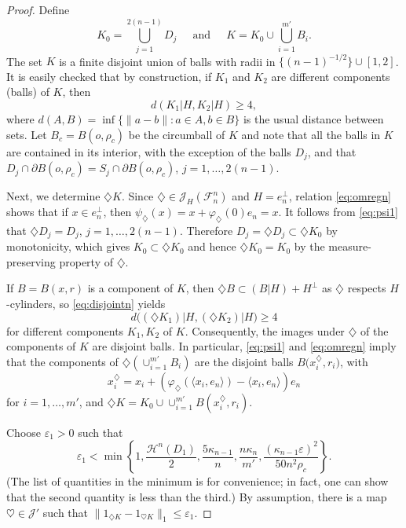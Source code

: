 \documentclass[10pt,a4paper]{amsart}
\newcommand{\cF}{\mathcal F}
\newcommand{\cH}{{\mathcal H}}
\newcommand{\cJ}{\mathcal J}
\newcommand{\di}{\diamondsuit}
\newcommand{\ee}{\varepsilon}
\begin{document}
\begin{proof}
Define
\[
K_0= {\textstyle \bigcup}_{j=1}^{2(n-1)} D_j ~~\quad{\text{and}}~~\quad
K=K_0\cup {\textstyle \bigcup}_{i=1}^{m'} B_i.
\]
The set $K$ is a finite disjoint union of balls with radii in $\{(n-1)^{-1/2}\}\cup[1,2]$. It is easily checked that by construction, if $K_1$ and $K_2$ are different components (balls) of $K$, then
\begin{equation}\label{eq:disjointn}
d(K_1|H,K_2|H)\ge 4,
\end{equation}
where $d(A,B)=\inf\{\|a-b\|: a\in A, b\in B\}$ is the usual distance between sets. Let $B_c=B(o,\rho_c)$ be the circumball of $K$ and note that all the balls in $K$ are contained in its interior, with the exception of the balls $D_j$, and that $D_j\cap\partial B(o,\rho_c)=S_j\cap \partial B(o,\rho_c)$, $j=1,\dots,2(n-1)$.

Next, we determine $\di K$. Since $\di\in \cJ_H(\cF_n^n)$ and $H=e_n^{\perp}$, relation
\eqref{eq:omregn} shows that if $x\in e_n^{\perp}$, then $\psi_{\di}(x)=x+\varphi_{\di}(0)e_n=x$. It follows from \eqref{eq:psi1} that $\di D_j=D_j$, $j=1,\dots, 2(n-1)$. Therefore $D_j=\di D_j\subset \di K_0$ by monotonicity, which gives $K_0\subset \di K_0$ and hence $\di K_0=K_0$ by the measure-preserving property of $\di$.

If $B=B(x,r)$ is a component of $K$, then $\di B\subset (B|H)+H^\perp$ as $\di$ respects $H$-cylinders, so \eqref{eq:disjointn} yields
\begin{equation}\label{eq:disjointn_din}
d\big((\di K_1)|H,(\di K_2)|H\big)\ge 4
\end{equation}
for different components $K_1, K_2$ of $K$. Consequently, the images under $\di$ of the components of $K$ are disjoint balls. In particular, \eqref{eq:psi1} and \eqref{eq:omregn} imply that the components of $\di \left(\cup_{i=1}^{m'} B_i\right)$ are the disjoint balls
$B\big(x_i^\di,r_i\big)$, with
\[
x_i^\di=x_i+\left(\varphi_\di(\langle x_i,e_n\rangle)-\langle x_i,e_n\rangle\right)e_n
\]
for $i=1,\dots,m'$, and $\di K=K_0\cup\cup_{i=1}^{m'} B(x_i^\di,r_i).$

Choose $\ee_1>0$ such that
\begin{equation}\label{eqepchoose}
\ee_1<\min\left\{1,\frac{{\cH}^n(D_1)}{2}, \frac{5\kappa_{n-1}}{n}, \frac{n\kappa_n}{m'}, \frac{(\kappa_{n-1}\ee)^2}{50n^2\rho_c}\right\}.
\end{equation}
(The list of quantities in the minimum is for convenience; in fact, one can show that the second quantity is less than the third.) By assumption, there is a map $\heartsuit\in \cJ'$ such that
$\|1_{\di K}-1_{\heartsuit K}\|_1\le \ee_1$.


\end{proof}
\end{document}
